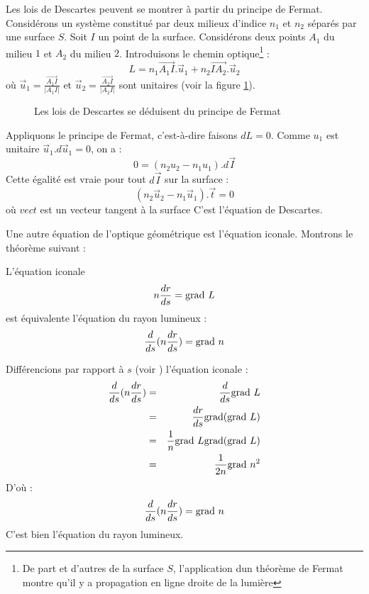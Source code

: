 \documentclass[12pt]{book}
\begin{document}
\begin{rem}
Les {lois de Descartes} peuvent se montrer
\`a partir du principe de 
Fermat. Consid\'erons un syst\`eme constitu\'e par deux milieux
d'indice $n_1$ et $n_2$ s\'epar\'es par une surface $S$. Soit $I$ un
point de la surface. Consid\'erons deux points $A_1$ du milieu $1$ et
$A_2$ du milieu $2$. Introduisons le chemin optique\footnote{De part
et d'autres de la surface $S$, l'application dun th\'eor\`eme de
Fermat montre qu'il y a propagation en ligne droite de la lumi\`ere} :
\begin{equation}
L=n_1\vec{A_1I}.\vec{u}_1+n_2\vec{IA_2}.\vec{u}_2
\end{equation}
o\`u $\vec{u}_1=\frac {\vec{A_1I}}{|A_1I|}$ et $\vec{u}_2=\frac
{\vec{A_2I}}{|A_2I|}$ sont unitaires (voir la figure \ref{figfermat}). 
\begin{figure}[htb]
 \centerline{}   
 \caption{Les lois de Descartes se d\'eduisent du principe de Fermat}
 \label{figfermat}
\end{figure}
Appliquons le principe de Fermat, c'est-\`a-dire faisons $dL=0$.
Comme $u_1$ est unitaire $\vec{u}_1.d\vec{u}_1=0$, on a :
\begin{equation}
0=(n_2u_2-n_1u_1).d\vec{I}
\end{equation}
Cette \'egalit\'e est vraie pour tout $d\vec{I}$ sur la surface :
\begin{equation}
(n_2\vec{u}_2-n_1\vec{u}_1).\vec t=0
\end{equation}
o\`u $vec t$ est un vecteur tangent \`a la surface
C'est l'\'equation de Descartes.
\end{rem}
Une autre \'equation de l'optique g\'eom\'etrique est 
l'\'equation iconale.
Montrons le th\'eor\`eme suivant :
\begin{thm}
L'\'equation iconale 
\begin{equation}
n\frac{dr}{ds}=\grad\ L
\end{equation}
est \'equivalente l'\'equation du rayon lumineux :
\begin{equation}
\frac{d}{ds}(n\frac{dr}{ds})=\grad\ n
\end{equation}
\end{thm}
\begin{pf}
Diff\'erencions par rapport \`a $s$ (voir \cite{ph:optic:Born65} ) l'\'equation
iconale :
\begin{eqnarray}
\frac{d}{ds}(n\frac{dr}{ds})&=&\frac{d}{ds}{\rm grad}\ L\\
&=&\frac{dr}{ds}{\rm grad}({\rm grad}\ L)\\
&=&\frac{1}{n}{\rm grad}\ L {\rm grad}({\rm grad}\ L)\\
&=&\frac{1}{2n}{\rm grad}\ n^2
\end{eqnarray}
D'o\`u :
\begin{equation}
\frac{d}{ds}(n\frac{dr}{ds})=\grad\ n
\end{equation}
C'est bien l'\'equation du rayon lumineux.
\end{pf}
\end{document}
